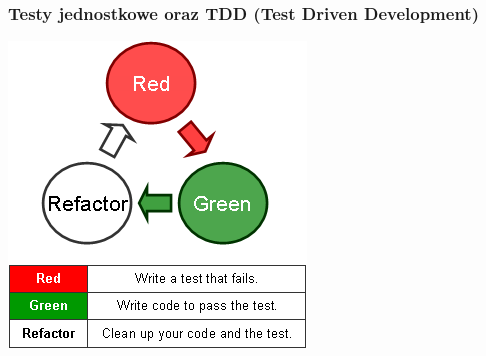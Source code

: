 \begin{frame}[fragile]
\frametitle{Testy jednostkowe oraz TDD (Test Driven Development)}
\includegraphics[scale=0.5]{tdd_cycle}
\end{frame}